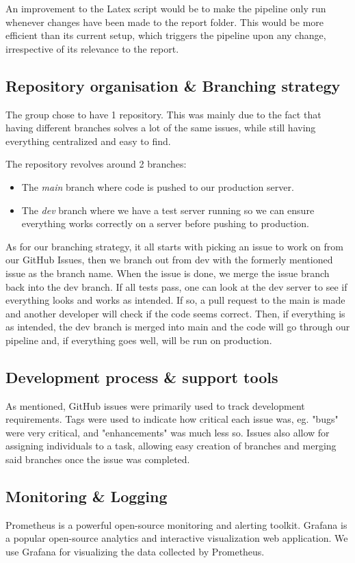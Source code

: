 An improvement to the Latex script would be to make the pipeline only run whenever changes have been made to the report folder. This would be more efficient than its current setup, which triggers the pipeline upon any change, irrespective of its relevance to the report.

\subsection{Repository organisation \& Branching strategy}
The group chose to have 1 repository. This was mainly due to the fact that having different branches solves a lot of the same issues, while still having everything centralized and easy to find.

The repository revolves around 2 branches: 
\begin{itemize}
    \item The \textit{main} branch where code is pushed to our production server.
    \item The \textit{dev} branch where we have a test server running so we can ensure everything works correctly on a server before pushing to production.
\end{itemize} 

As for our branching strategy, it all starts with picking an issue to work on from our GitHub Issues, then we branch out from dev with the formerly mentioned issue as the branch name. When the issue is done, we merge the issue branch back into the dev branch. If all tests pass, one can look at the dev server to see if everything looks and works as intended. If so, a pull request to the main is made and another developer will check if the code seems correct. Then, if everything is as intended, the dev branch is merged into main and the code will go through our pipeline and, if everything goes well, will be run on production.

\subsection{Development process \& support tools}
As mentioned, GitHub issues were primarily used to track development requirements. Tags were used to indicate how critical each issue was, eg. "bugs" were very critical, and "enhancements" was much less so. Issues also allow for assigning individuals to a task, allowing easy creation of branches and merging said branches once the issue was completed. 

\subsection{Monitoring \& Logging}
Prometheus is a powerful open-source monitoring and alerting toolkit. Grafana is a popular open-source analytics and interactive visualization web application. We use Grafana for visualizing the data collected by Prometheus.

